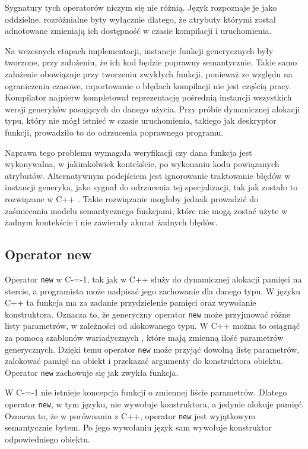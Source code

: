 Sygnatury tych operatorów niczym się nie różnią.
Język rozpoznaje je jako oddzielne, rozróżnialne byty wyłącznie dlatego, że atrybuty którymi został adnotowane zmieniają ich dostępność w czasie kompilacji i uruchomienia.

Na wczesnych etapach implementacji, instancje funkcji generycznych były tworzone, przy założeniu, że ich kod będzie poprawny semantycznie.
Takie samo założenie obowiązuje przy tworzeniu zwykłych funkcji, ponieważ ze względu na ograniczenia czasowe, raportowanie o błędach kompilacji nie jest częścią pracy.
Kompilator najpierw kompletował reprezentację pośrednią instancji wszystkich wersji generyków pasujących do danego użycia.
Przy próbie dynamicznej alokacji typu, który nie mógł istnieć w czasie uruchomienia, takiego jak deskryptor funkcji, prowadziło to do odrzucenia poprawnego programu.

Naprawa tego problemu wymagała weryfikacji czy dana funkcja jest wykonywalna, w jakimkolwiek kontekście, po wykonaniu kodu powiązanych atrybutów.
Alternatywnym podejściem jest ignorowanie traktowanie błędów w instancji generyka, jako sygnał do odrzucenia tej specjalizacji, tak jak zostało to rozwiązane w C++ \cite{cppTemplatesCompleteGuide}.
Takie rozwiązanie mogłoby jednak prowadzić do zaśmiecania modelu semantycznego funkcjami, które nie mogą zostać użyte w żadnym kontekście i nie zawierały akurat żadnych błędów.
\subsection{Operator new}
\label{operator_new}
Operator \lstinline{new} w C-=-1, tak jak w C++ służy do dynamicznej alokacji pamięci na stercie, a programista może nadpisać jego zachowanie dla danego typu.
W języku C++ ta funkcja ma za zadanie przydzielenie pamięci oraz wywołanie konstruktora.
Oznacza to, że generyczny operator \lstinline{new} może przyjmować różne listy parametrów, w zależności od alokowanego typu.
W C++ można to osiągnąć za pomocą szablonów wariadycznych \cite{gregor2007variadic}, które mają zmienną ilość parametrów generycznych.
Dzięki temu operator \lstinline{new} może przyjąć dowolną listę parametrów, zalokować pamięć na obiekt i przekazać argumenty do konstruktora obiektu.
Operator \lstinline{new} zachowuje się jak zwykła funkcja.

W C-=-1 nie istnieje koncepcja funkcji o zmiennej liście parametrów.
Dlatego operator \lstinline{new}, w tym języku, nie wywołuje konstruktora, a jedynie alokuje pamięć.
Oznacza to, że w porównaniu z C++, operator \lstinline{new} jest wyjątkowym semantycznie bytem.
Po jego wywołaniu język sam wywołuje konstruktor odpowiedniego obiektu.


